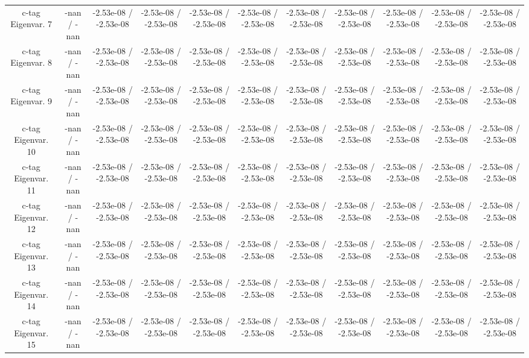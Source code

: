 \begin{table}[htbp]
\begin{center}
\begin{tabular}{|c|c|c|c|c|c|c|c|c|c|c|}
  c-tag Eigenvar. 7 & -nan / -nan & -2.53e-08 / -2.53e-08 & -2.53e-08 / -2.53e-08 & -2.53e-08 / -2.53e-08 & -2.53e-08 / -2.53e-08 & -2.53e-08 / -2.53e-08 & -2.53e-08 / -2.53e-08 & -2.53e-08 / -2.53e-08 & -2.53e-08 / -2.53e-08 & -2.53e-08 / -2.53e-08 \\ 
  c-tag Eigenvar. 8 & -nan / -nan & -2.53e-08 / -2.53e-08 & -2.53e-08 / -2.53e-08 & -2.53e-08 / -2.53e-08 & -2.53e-08 / -2.53e-08 & -2.53e-08 / -2.53e-08 & -2.53e-08 / -2.53e-08 & -2.53e-08 / -2.53e-08 & -2.53e-08 / -2.53e-08 & -2.53e-08 / -2.53e-08 \\ 
  c-tag Eigenvar. 9 & -nan / -nan & -2.53e-08 / -2.53e-08 & -2.53e-08 / -2.53e-08 & -2.53e-08 / -2.53e-08 & -2.53e-08 / -2.53e-08 & -2.53e-08 / -2.53e-08 & -2.53e-08 / -2.53e-08 & -2.53e-08 / -2.53e-08 & -2.53e-08 / -2.53e-08 & -2.53e-08 / -2.53e-08 \\ 
  c-tag Eigenvar. 10 & -nan / -nan & -2.53e-08 / -2.53e-08 & -2.53e-08 / -2.53e-08 & -2.53e-08 / -2.53e-08 & -2.53e-08 / -2.53e-08 & -2.53e-08 / -2.53e-08 & -2.53e-08 / -2.53e-08 & -2.53e-08 / -2.53e-08 & -2.53e-08 / -2.53e-08 & -2.53e-08 / -2.53e-08 \\ 
  c-tag Eigenvar. 11 & -nan / -nan & -2.53e-08 / -2.53e-08 & -2.53e-08 / -2.53e-08 & -2.53e-08 / -2.53e-08 & -2.53e-08 / -2.53e-08 & -2.53e-08 / -2.53e-08 & -2.53e-08 / -2.53e-08 & -2.53e-08 / -2.53e-08 & -2.53e-08 / -2.53e-08 & -2.53e-08 / -2.53e-08 \\ 
  c-tag Eigenvar. 12 & -nan / -nan & -2.53e-08 / -2.53e-08 & -2.53e-08 / -2.53e-08 & -2.53e-08 / -2.53e-08 & -2.53e-08 / -2.53e-08 & -2.53e-08 / -2.53e-08 & -2.53e-08 / -2.53e-08 & -2.53e-08 / -2.53e-08 & -2.53e-08 / -2.53e-08 & -2.53e-08 / -2.53e-08 \\ 
  c-tag Eigenvar. 13 & -nan / -nan & -2.53e-08 / -2.53e-08 & -2.53e-08 / -2.53e-08 & -2.53e-08 / -2.53e-08 & -2.53e-08 / -2.53e-08 & -2.53e-08 / -2.53e-08 & -2.53e-08 / -2.53e-08 & -2.53e-08 / -2.53e-08 & -2.53e-08 / -2.53e-08 & -2.53e-08 / -2.53e-08 \\ 
  c-tag Eigenvar. 14 & -nan / -nan & -2.53e-08 / -2.53e-08 & -2.53e-08 / -2.53e-08 & -2.53e-08 / -2.53e-08 & -2.53e-08 / -2.53e-08 & -2.53e-08 / -2.53e-08 & -2.53e-08 / -2.53e-08 & -2.53e-08 / -2.53e-08 & -2.53e-08 / -2.53e-08 & -2.53e-08 / -2.53e-08 \\ 
  c-tag Eigenvar. 15 & -nan / -nan & -2.53e-08 / -2.53e-08 & -2.53e-08 / -2.53e-08 & -2.53e-08 / -2.53e-08 & -2.53e-08 / -2.53e-08 & -2.53e-08 / -2.53e-08 & -2.53e-08 / -2.53e-08 & -2.53e-08 / -2.53e-08 & -2.53e-08 / -2.53e-08 & -2.53e-08 / -2.53e-08 \\ 

\end{tabular}
\end{center}
\end{table}
